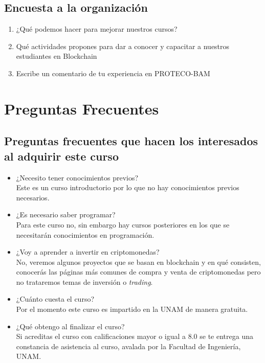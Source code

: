 \documentclass[a4paper,12pt]{/home/armando/Documentos/Cursos/LaTeX/Plantillas/lib/pub}
\begin{document}
\subsection{Encuesta a la organización}
\begin{enumerate}
	\item ¿Qué podemos hacer para mejorar nuestros cursos?
	\item Qué actividades propones para dar a conocer y capacitar a nuestros estudiantes en Blockchain
	\item Escribe un comentario de tu experiencia en PROTECO-BAM
\end{enumerate}
\section{Preguntas Frecuentes}
\subsection{Preguntas frecuentes que hacen los interesados al adquirir este curso}
\begin{itemize}
	\item ¿Necesito tener conocimientos previos?\\Este es un curso introductorio por lo que no hay conocimientos previos necesarios.
	\item ¿Es necesario saber programar?\\Para este curso no, sin embargo hay cursos posteriores en los que se necesitarán conocimientos en programación.
	\item ¿Voy a aprender a invertir en criptomonedas?\\No, veremos algunos proyectos que se basan en blockchain y en qué consisten, conocerás las páginas más comunes de compra y venta de criptomonedas pero no trataremos temas de inversión o \textit{trading}.
	\item ¿Cuánto cuesta el curso?\\Por el momento este curso es impartido en la UNAM de manera gratuita.
	\item ¿Qué obtengo al finalizar el curso?\\Si acreditas el curso con calificaciones mayor o igual a 8.0 se te entrega una constancia de asistencia al curso, avalada por la Facultad de Ingeniería, UNAM.
\end{itemize}
\end{document}
